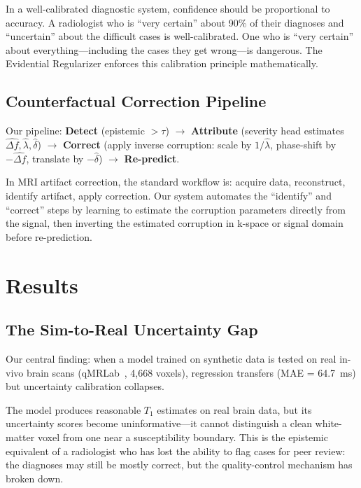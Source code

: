\documentclass[11pt,a4paper]{article}
\begin{document}
\begin{intuition}
In a well-calibrated diagnostic system, confidence should be proportional to accuracy. A radiologist who is ``very certain'' about 90\% of their diagnoses and ``uncertain'' about the difficult cases is well-calibrated. One who is ``very certain'' about everything---including the cases they get wrong---is dangerous. The Evidential Regularizer enforces this calibration principle mathematically.
\end{intuition}

\subsection{Counterfactual Correction Pipeline}

Our pipeline: \textbf{Detect} (epistemic $> \tau$) $\to$ \textbf{Attribute} (severity head estimates $\hat{\Delta f}, \hat{\lambda}, \hat{\delta}$) $\to$ \textbf{Correct} (apply inverse corruption: scale by $1/\hat{\lambda}$, phase-shift by $-\hat{\Delta f}$, translate by $-\hat{\delta}$) $\to$ \textbf{Re-predict}.

\begin{intuition}
In MRI artifact correction, the standard workflow is: acquire data, reconstruct, identify artifact, apply correction. Our system automates the ``identify'' and ``correct'' steps by learning to estimate the corruption parameters directly from the signal, then inverting the estimated corruption in k-space or signal domain before re-prediction.
\end{intuition}

\section{Results}
\label{sec:results}

\subsection{The Sim-to-Real Uncertainty Gap}

Our central finding: when a model trained on synthetic data is tested on real in-vivo brain scans (qMRLab~\citep{qmrlab}, 4,668 voxels), regression transfers (MAE = 64.7~ms) but uncertainty calibration collapses.

\begin{intuition}
The model produces reasonable $T_1$ estimates on real brain data, but its uncertainty scores become uninformative---it cannot distinguish a clean white-matter voxel from one near a susceptibility boundary. This is the epistemic equivalent of a radiologist who has lost the ability to flag cases for peer review: the diagnoses may still be mostly correct, but the quality-control mechanism has broken down.
\end{intuition}
\end{document}
